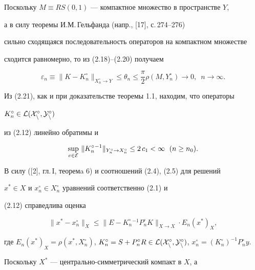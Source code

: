 Поскольку $M\equiv RS(0,1)$ --- компактное множество в пространстве $Y$,


а в силу теоремы И.М.\,Гельфанда (напр., [17],  с.\,274--276)


сильно сходящаяся последовательность операторов на компактном множестве


сходится равномерно, то из (2.18)--(2.20) получаем


\begin{equation}


\varepsilon_n\equiv \|K-K_n^\circ\|_{X_n^\circ \rightarrow Y}\leq


\theta_n\leq \frac{\pi}{2}\rho(M,Y_n^\circ )\rightarrow 0,\ \;


n\rightarrow \infty .


\end{equation}


Из (2.21), как и при доказательстве теоремы 1.1, находим, что операторы


$K_n^\circ\in \cal L(X_n^\circ,Y_n^\circ)$


из (2.12) линейно обратимы и


\begin{equation}


\sup_{e\in \cal E}\, \|K_n^\circ {}^{-1}\|_{Y_n^\circ\rightarrow X_n^\circ}


\leq 2\, c_1<\infty\ \; (n\geq n_0).


\end{equation}





В силу ([2], гл.\,I, теоремa 6) и соотношений (2.4), (2.5) для решений


$x^*\in X$ и $x_n^\circ\in X_n^\circ$ уравнений соответственно (2.1) и


(2.12) справедлива оценка


\begin{equation}


\|x^*-x_n^\circ\|_X\leq \|E-K_n^\circ {}^{-1}P_n^\circ


K\|_{X\rightarrow X}\cdot E_n(x^*)_X ,


\end{equation}


где $E_n(x^*)_X =\rho(x^*,X_n^\circ )$, $K_n^\circ =S+P_n^\circ R\in


\cal L(X_n^\circ,Y_n^\circ)$, $x_n^\circ =(K_n^\circ )^{-1}P_n^\circ y$.


Поскольку $X^*$ --- центрально-симметрический компакт в $X$, а


